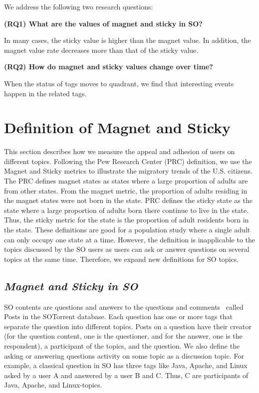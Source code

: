 \documentclass[conference]{IEEEtran}
\begin{document}
We address the following two research questions:

\noindent \textbf{(RQ1) What are the values of magnet and sticky in SO?}\par
In many cases, the sticky value is higher than the magnet value. In addition, the magnet value rate decreases more than that of the sticky value.

\noindent \textbf{(RQ2) How do magnet and sticky values change over time?}\par
When the status of tags moves to quadrant, we find that interesting events happen in the related tags.

\section{Definition of Magnet and Sticky} \label{magnet}
This section describes how we measure the appeal and adhesion of users on different topics. Following the Pew Research Center (PRC) definition, we use the Magnet and Sticky metrics to illustrate the migratory trends of the U.S. citizens. The PRC defines magnet states as states where a large proportion of adults are from other states. From the magnet metric, the proportion of adults residing in the magnet states were not born in the state. PRC defines the sticky state as the state where a large proportion of adults born there continue to live in the state. Thus, the sticky metric for the state is the proportion of adult residents born in the state. These definitions are good for a population study where a single adult can only occupy one state at a time. However, the definition is inapplicable to the topics discussed by the SO users as users can ask or answer questions on several topics at the same time. Therefore, we expand new definitions for SO topics.


\subsection*{\textit{\textbf{Magnet and Sticky in SO}}}

SO contents are questions and answers to the questions and comments~\cite{liu2018mining} called Posts in the  SOTorrent\cite{baltes2018sotorrent} database. Each question has one or more tags that separate the question into different topics. Posts on a question have their creator (for the question content, one is the questioner, and for the answer, one is the respondent), a participant of the topics, and the question. We also define the asking or answering questions activity on some topic as a discussion topic. For example, a classical question in SO has three tags like Java, Apache, and Linux asked by a user A and answered by a user B and C. Thus, C are participants of Java, Apache, and Linux-topics.
\end{document}

